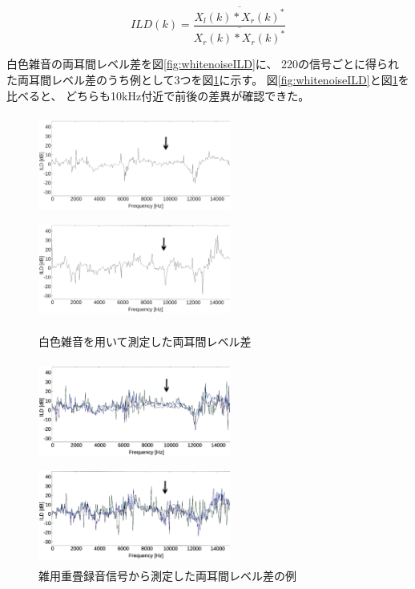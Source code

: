 \documentclass[autodetect-engine,12pt,titlepagedvi=dvipdfmx,ja=standard]{bxjsreport}
\begin{document}
  \begin{equation}
      ILD(k) = \frac{\overline{ X_l(k)*X_r(k)^{*} }}{ \overline{ X_r(k)*X_r(k)^{*} }}\label{formula:ILD}
  \end{equation}
  
白色雑音の両耳間レベル差を図\ref{fig:whitenoiseILD}に、
220の信号ごとに得られた両耳間レベル差のうち例として3つを図\ref{fig:AILD}に示す。
図\ref{fig:whitenoiseILD}と図\ref{fig:AILD}を比べると、
どちらも10kHz付近で前後の差異が確認できた。


\begin{figure}[htbp]
  \begin{center}
       \includegraphics[clip, width=2.5in, height = 1.3in]{picture/mae_full_whitenoise.eps}
       \includegraphics[clip, width=2.5in, height = 1.3in]{picture/usiro_full_whitenoise.eps}
       \end{center}
       \caption{白色雑音を用いて測定した両耳間レベル差}\label{fig:whitenoiseILD}     
 
  \begin{center}
  \includegraphics[clip, width=2.5in, height = 1.3in]{picture/mae_full_NoSmoothing.eps}
  
  \includegraphics[clip, width=2.5in, height = 1.3in]{picture/usiro_full_NoSmoothing.eps}
  \end{center}
  \caption{雑用重畳録音信号から測定した両耳間レベル差の例}\label{fig:AILD}
\end{figure}
\end{document}
